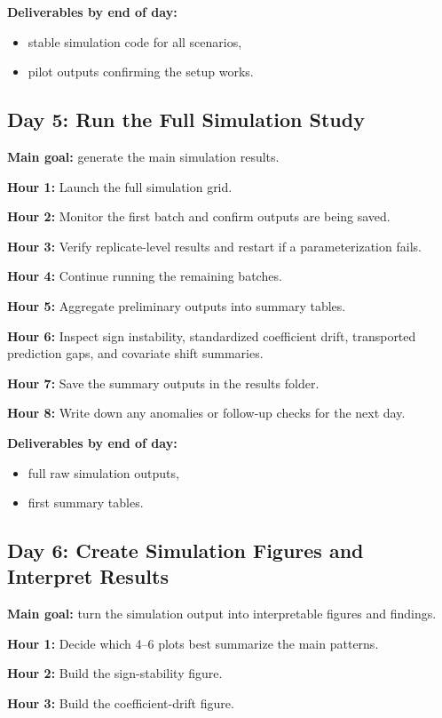 \documentclass[11pt]{article}
\begin{document}
\textbf{Deliverables by end of day:}
\begin{itemize}
    \item stable simulation code for all scenarios,
    \item pilot outputs confirming the setup works.
\end{itemize}

\subsection*{Day 5: Run the Full Simulation Study}
\textbf{Main goal:} generate the main simulation results.

\textbf{Hour 1:} Launch the full simulation grid.

\textbf{Hour 2:} Monitor the first batch and confirm outputs are being saved.

\textbf{Hour 3:} Verify replicate-level results and restart if a parameterization fails.

\textbf{Hour 4:} Continue running the remaining batches.

\textbf{Hour 5:} Aggregate preliminary outputs into summary tables.

\textbf{Hour 6:} Inspect sign instability, standardized coefficient drift, transported prediction gaps, and covariate shift summaries.

\textbf{Hour 7:} Save the summary outputs in the results folder.

\textbf{Hour 8:} Write down any anomalies or follow-up checks for the next day.

\textbf{Deliverables by end of day:}
\begin{itemize}
    \item full raw simulation outputs,
    \item first summary tables.
\end{itemize}

\subsection*{Day 6: Create Simulation Figures and Interpret Results}
\textbf{Main goal:} turn the simulation output into interpretable figures and findings.

\textbf{Hour 1:} Decide which 4--6 plots best summarize the main patterns.

\textbf{Hour 2:} Build the sign-stability figure.

\textbf{Hour 3:} Build the coefficient-drift figure.
\end{document}
